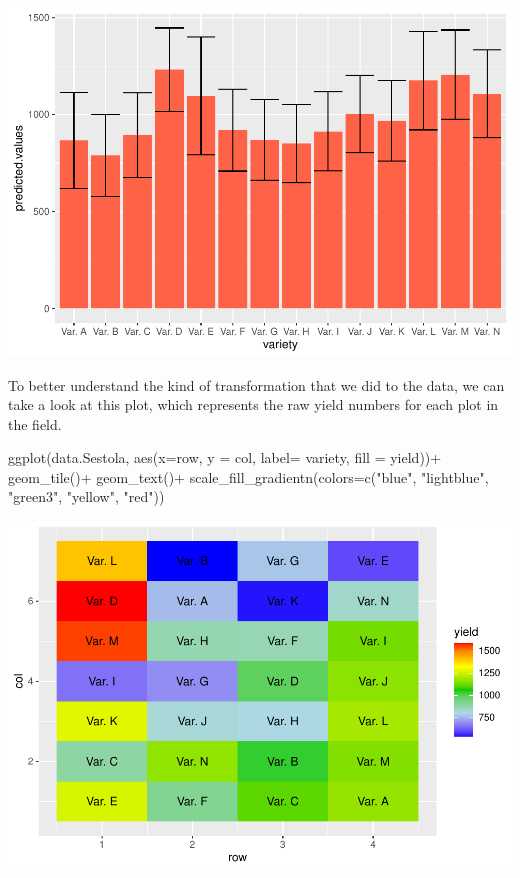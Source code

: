 \documentclass[
]{book}
\newenvironment{Shaded}{\begin{snugshade}}{\end{snugshade}}
\newcommand{\AttributeTok}[1]{\textcolor[rgb]{0.77,0.63,0.00}{#1}}
\newcommand{\FunctionTok}[1]{\textcolor[rgb]{0.00,0.00,0.00}{#1}}
\newcommand{\NormalTok}[1]{#1}
\newcommand{\SpecialCharTok}[1]{\textcolor[rgb]{0.00,0.00,0.00}{#1}}
\newcommand{\StringTok}[1]{\textcolor[rgb]{0.31,0.60,0.02}{#1}}
\begin{document}
\includegraphics{PPB-Toolkit-for-R-and-R-Studio_files/figure-latex/sestolaadjmeans-1.pdf}

To better understand the kind of transformation that we did to the data, we can take a look at this plot, which represents the raw yield numbers for each plot in the field.

\begin{Shaded}
\begin{Highlighting}[]
\FunctionTok{ggplot}\NormalTok{(data.Sestola, }\FunctionTok{aes}\NormalTok{(}\AttributeTok{x=}\NormalTok{row, }\AttributeTok{y =}\NormalTok{ col, }\AttributeTok{label=}\NormalTok{ variety, }\AttributeTok{fill =}\NormalTok{ yield))}\SpecialCharTok{+}
  \FunctionTok{geom\_tile}\NormalTok{()}\SpecialCharTok{+}
  \FunctionTok{geom\_text}\NormalTok{()}\SpecialCharTok{+}
  \FunctionTok{scale\_fill\_gradientn}\NormalTok{(}\AttributeTok{colors=}\FunctionTok{c}\NormalTok{(}\StringTok{"blue"}\NormalTok{, }\StringTok{"lightblue"}\NormalTok{, }\StringTok{"green3"}\NormalTok{, }\StringTok{"yellow"}\NormalTok{, }\StringTok{"red"}\NormalTok{))}
\end{Highlighting}
\end{Shaded}

\includegraphics{PPB-Toolkit-for-R-and-R-Studio_files/figure-latex/rawSestola-1.pdf}
\end{document}
